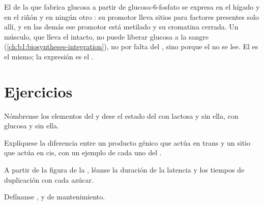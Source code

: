 \begin{example}\label{ex:b1:expression-control:twoorgans}
El  de la  que fabrica glucosa a partir de glucosa-6-fosfato se
expresa en el hígado y en el riñón y en ningún otro : su promotor
lleva sitios para factores presentes solo allí, y en las demás  ese
promotor está metilado y su cromatina cerrada. Un músculo, que lleva el 
intacto, no puede liberar glucosa a la sangre
(\cref{ch:b1:biosyntheses-integration}), no por falta del , sino porque
el  no se lee. El  es el mismo; la expresión es el .
\end{example}

\section{Ejercicios}

\begin{exercise}[$\star$]\label{exo:b1:expression-control:1}
Nómbrense los elementos del  y dese el estado del  con
lactosa y sin ella, con glucosa y sin ella.
\end{exercise}

\begin{exercise}[$\star$]\label{exo:b1:expression-control:2}
Explíquese la diferencia entre un producto génico que actúa en trans y un
sitio que actúa en cis, con un ejemplo de cada uno del .
\end{exercise}

\begin{exercise}[$\star$]\label{exo:b1:expression-control:3}
A partir de la figura de la , léanse la duración de la latencia y los
tiempos de duplicación con cada azúcar.
\end{exercise}

\begin{exercise}[$\star$]\label{exo:b1:expression-control:4}
Defínanse ,  y  de mantenimiento.
\end{exercise}

